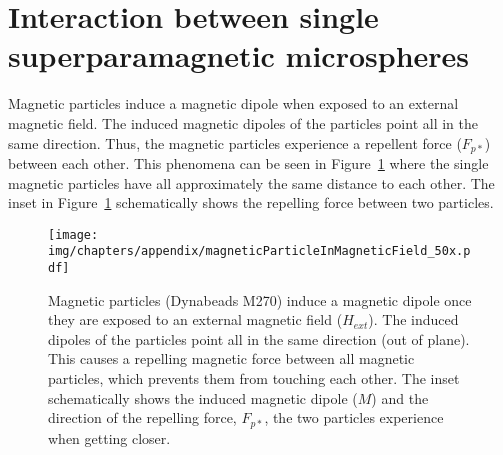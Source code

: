 \section{Interaction between single superparamagnetic microspheres}
Magnetic particles induce a magnetic dipole when exposed to an external magnetic field. The induced magnetic dipoles of the particles point all in the same direction. Thus, the magnetic particles experience a repellent force ($F_{p\ast}$) between each other. This phenomena can be seen in Figure~\ref{fig:interactionBetweenSingleSuperparamagneticMicrospheres} where the single magnetic particles have all approximately the same distance to each other. The inset in Figure~\ref{fig:interactionBetweenSingleSuperparamagneticMicrospheres} schematically shows the repelling force between two particles. 
\begin{figure}[htb]
	\centering
	\texttt{[image: img/chapters/appendix/magneticParticleInMagneticField\_50x.pdf]}
	\label{fig:interactionBetweenSingleSuperparamagneticMicrospheres}
	\caption[Repellent force between individual dipoles]{Magnetic particles (Dynabeads M270) induce a magnetic dipole once they are exposed to an external magnetic field ($H_{ext}$). The induced dipoles of the particles point all in the same direction (out of plane). This causes a repelling magnetic force between all magnetic particles, which prevents them from touching each other. The inset schematically shows the induced magnetic dipole ($M$) and the direction of the repelling force, $F_{p\ast}$, the two particles experience when getting closer.}
\end{figure}

